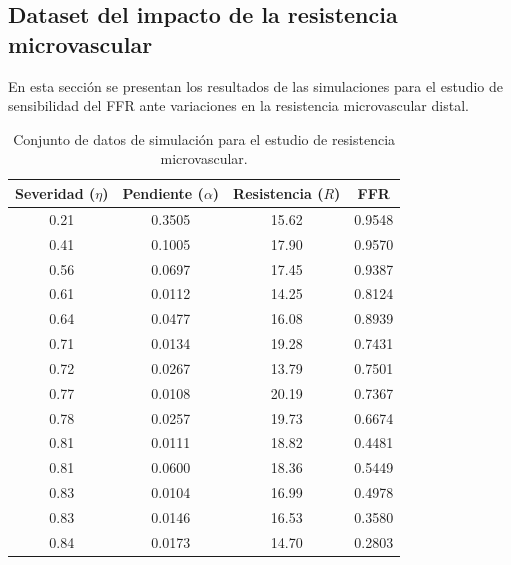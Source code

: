 \documentclass[12pt, letterpaper]{article}
\begin{document}
\begin{appendices}
\subsection{Dataset del impacto de la resistencia microvascular}
\label{app:resistencia_dataset}

En esta sección se presentan los resultados de las simulaciones para el estudio de sensibilidad del FFR ante variaciones en la resistencia microvascular distal.

\begin{table}[htbp]
  \centering
  \caption{Conjunto de datos de simulación para el estudio de resistencia microvascular.}
  \label{tab:ffr_resistance_dataset}
  \begin{tabular}{cccc}
    \toprule
    \textbf{Severidad ($\eta$)} & \textbf{Pendiente ($\alpha$)} & \textbf{Resistencia ($R$)} & \textbf{FFR} \\ \midrule
    0.21 & 0.3505 & 15.62 & 0.9548 \\
    0.41 & 0.1005 & 17.90 & 0.9570 \\
    0.56 & 0.0697 & 17.45 & 0.9387 \\
    0.61 & 0.0112 & 14.25 & 0.8124 \\
    0.64 & 0.0477 & 16.08 & 0.8939 \\
    0.71 & 0.0134 & 19.28 & 0.7431 \\
    0.72 & 0.0267 & 13.79 & 0.7501 \\
    0.77 & 0.0108 & 20.19 & 0.7367 \\
    0.78 & 0.0257 & 19.73 & 0.6674 \\
    0.81 & 0.0111 & 18.82 & 0.4481 \\
    0.81 & 0.0600 & 18.36 & 0.5449 \\
    0.83 & 0.0104 & 16.99 & 0.4978 \\
    0.83 & 0.0146 & 16.53 & 0.3580 \\
    0.84 & 0.0173 & 14.70 & 0.2803 \\ \bottomrule
  \end{tabular}
\end{table}

\end{appendices}
\end{document}
